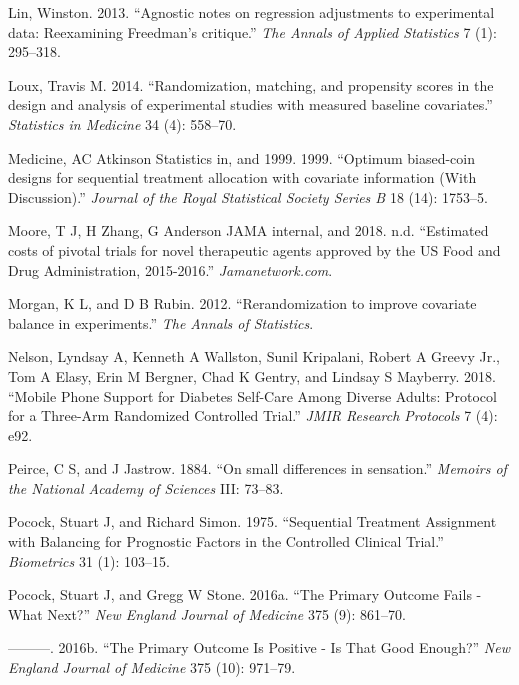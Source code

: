 \documentclass[12pt,oneside]{book}
\newlength{\li}\setlength{\li}{14.48pt}
\newlength{\di}\setlength{\di}{-3.5mm}
\theoremstyle{definition}
\theoremstyle{definition}
\theoremstyle{definition}
\theoremstyle{remark}
\begin{document}
\leavevmode\hypertarget{ref-Lin:2013jh}{}%
Lin, Winston. 2013. ``Agnostic notes on regression adjustments to
experimental data: Reexamining Freedman's critique.'' \emph{The Annals
of Applied Statistics} 7 (1): 295--318.

\leavevmode\hypertarget{ref-Loux:2014bu}{}%
Loux, Travis M. 2014. ``Randomization, matching, and propensity scores
in the design and analysis of experimental studies with measured
baseline covariates.'' \emph{Statistics in Medicine} 34 (4): 558--70.

\leavevmode\hypertarget{ref-Atkinson:1999hq}{}%
Medicine, AC Atkinson Statistics in, and 1999. 1999. ``Optimum
biased-coin designs for sequential treatment allocation with covariate
information (With Discussion).'' \emph{Journal of the Royal Statistical
Society Series B} 18 (14): 1753--5.

\leavevmode\hypertarget{ref-Moore:wc}{}%
Moore, T J, H Zhang, G Anderson JAMA internal, and 2018. n.d.
``Estimated costs of pivotal trials for novel therapeutic agents
approved by the US Food and Drug Administration, 2015-2016.''
\emph{Jamanetwork.com}.

\leavevmode\hypertarget{ref-Morgan:2012iq}{}%
Morgan, K L, and D B Rubin. 2012. ``Rerandomization to improve covariate
balance in experiments.'' \emph{The Annals of Statistics}.

\leavevmode\hypertarget{ref-Nelson:2018bw}{}%
Nelson, Lyndsay A, Kenneth A Wallston, Sunil Kripalani, Robert A Greevy
Jr., Tom A Elasy, Erin M Bergner, Chad K Gentry, and Lindsay S Mayberry.
2018. ``Mobile Phone Support for Diabetes Self-Care Among Diverse
Adults: Protocol for a Three-Arm Randomized Controlled Trial.''
\emph{JMIR Research Protocols} 7 (4): e92.

\leavevmode\hypertarget{ref-Peirce:1884wra}{}%
Peirce, C S, and J Jastrow. 1884. ``On small differences in sensation.''
\emph{Memoirs of the National Academy of Sciences} III: 73--83.

\leavevmode\hypertarget{ref-Pocock:1975wd}{}%
Pocock, Stuart J, and Richard Simon. 1975. ``Sequential Treatment
Assignment with Balancing for Prognostic Factors in the Controlled
Clinical Trial.'' \emph{Biometrics} 31 (1): 103--15.

\leavevmode\hypertarget{ref-Pocock:2016ey}{}%
Pocock, Stuart J, and Gregg W Stone. 2016a. ``The Primary Outcome Fails
- What Next?'' \emph{New England Journal of Medicine} 375 (9): 861--70.

\leavevmode\hypertarget{ref-Pocock:2016ca}{}%
---------. 2016b. ``The Primary Outcome Is Positive - Is That Good
Enough?'' \emph{New England Journal of Medicine} 375 (10): 971--79.
\end{document}
